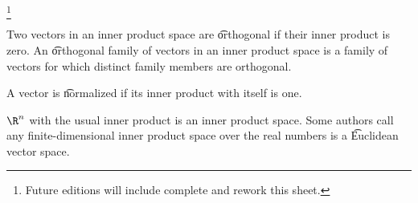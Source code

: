 
\footnote{Future editions will include complete and rework this sheet.}


Two vectors in an inner product space are \t{orthogonal} if their inner product is zero.
An \t{orthogonal family of vectors} in an inner product space is a family of vectors for which distinct family members are orthogonal.

A vector is \t{normalized} if its inner product with itself is one.


$\R^n$ with the usual inner product is an inner product space.
Some authors call any finite-dimensional inner product space over the real numbers is a \t{Euclidean vector space}.

\blankpage
